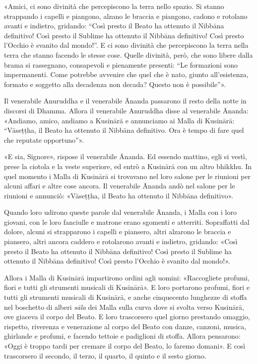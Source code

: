 «Amici, ci sono divinità che percepiscono la terra nello spazio. Si
stanno strappando i capelli e piangono, alzano le braccia e piangono,
cadono e rotolano avanti e indietro, gridando: “Così presto il Beato ha
ottenuto il Nibbāna definitivo! Così presto il Sublime ha ottenuto il
Nibbāna definitivo! Così presto l’Occhio è svanito dal mondo!”. E ci
sono divinità che percepiscono la terra nella terra che stanno facendo
le stesse cose. Quelle divinità, però, che sono libere dalla brama si
rassegnano, consapevoli e pienamente presenti: “Le formazioni sono
impermanenti. Come potrebbe avvenire che quel che è nato, giunto
all’esistenza, formato e soggetto alla decadenza non decada? Questo non
è possibile”».


Il venerabile Anuruddha e il venerabile Ānanda passarono il resto della
notte in discorsi di Dhamma. Allora il venerabile Anuruddha disse al
venerabile Ānanda: «Andiamo, amico, andiamo a Kusinārā e annunciamo ai
Malla di Kusinārā: “Vāseṭṭha, il Beato ha ottenuto il Nibbāna
definitivo. Ora è tempo di fare quel che reputate opportuno”».


«E sia, Signore», rispose il venerabile Ānanda. Ed essendo mattino, egli
si vestì, prese la ciotola e la veste superiore, ed entrò a Kusinārā con
un altro bhikkhu. In quel momento i Malla di Kusinārā si trovavano nel
loro salone per le riunioni per alcuni affari e altre cose ancora. Il
venerabile Ānanda andò nel salone per le riunioni e annunciò: «Vāseṭṭha,
il Beato ha ottenuto il Nibbāna definitivo».


Quando loro udirono queste parole dal venerabile Ānanda, i Malla con i
loro giovani, con le loro fanciulle e matrone erano sgomenti e
atterriti. Sopraffatti dal dolore, alcuni si strapparono i capelli e
piansero, altri alzarono le braccia e piansero, altri ancora caddero e
rotolarono avanti e indietro, gridando: «Così presto il Beato ha
ottenuto il Nibbāna definitivo! Così presto il Sublime ha ottenuto il
Nibbāna definitivo! Così presto l’Occhio è svanito dal mondo!».


Allora i Malla di Kusinārā impartirono ordini agli uomini: «Raccogliete
profumi, fiori e tutti gli strumenti musicali di Kusinārā». E loro
portarono profumi, fiori e tutti gli strumenti musicali di Kusinārā, e
anche cinquecento lunghezze di stoffa nel boschetto di alberi \emph{sāla} dei
Malla sulla curva dove si svolta verso Kusinārā, ove giaceva il corpo
del Beato. E loro trascorsero quel giorno prestando omaggio, rispetto,
riverenza e venerazione al corpo del Beato con danze, canzoni, musica,
ghirlande e profumi, e facendo tettoie e padiglioni di stoffa. Allora
pensarono: «Oggi è troppo tardi per cremare il corpo del Beato, lo
faremo domani». E così trascorsero il secondo, il terzo, il quarto, il
quinto e il sesto giorno.


